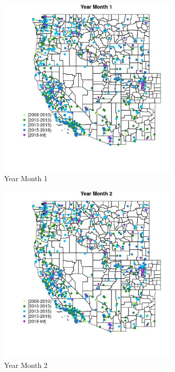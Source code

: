 \begin{figure} 
\centering  
\includegraphics[width=0.77\textwidth]{Code_Outputs/Report_ML_input_PM25_Step4_part_e_de_duplicated_aveswNAs_MapObsMo1Year.jpg} 
\caption{\label{fig:Report_ML_input_PM25_Step4_part_e_de_duplicated_aveswNAsMapObsMo1Year}Year Month 1} 
\end{figure} 
 

\begin{figure} 
\centering  
\includegraphics[width=0.77\textwidth]{Code_Outputs/Report_ML_input_PM25_Step4_part_e_de_duplicated_aveswNAs_MapObsMo2Year.jpg} 
\caption{\label{fig:Report_ML_input_PM25_Step4_part_e_de_duplicated_aveswNAsMapObsMo2Year}Year Month 2} 
\end{figure} 
 

